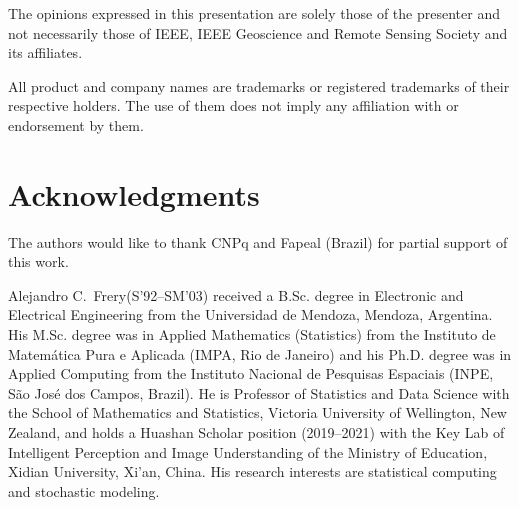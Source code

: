 \documentclass[journal,twoside]{IEEEtran}
\begin{document}
The opinions expressed in this presentation are solely those of the presenter and not necessarily those of IEEE, IEEE Geoscience and Remote Sensing Society and its affiliates.

All product and company names are trademarks or registered trademarks of their respective holders. The use of them does not imply any affiliation with or endorsement by them. 

\section*{Acknowledgments}

The authors would like to thank CNPq and Fapeal (Brazil) for partial support of this work.


	

\begin{IEEEbiography}{Alejandro C.\ Frery}(S'92--SM'03)
received a B.Sc. degree in Electronic and Electrical Engineering from the Universidad de Mendoza, Mendoza, Argentina.
His M.Sc. degree was in Applied Mathematics (Statistics) from the Instituto de Matem\'atica Pura e Aplicada (IMPA, Rio de Janeiro) and his Ph.D. degree was in Applied Computing from the Instituto Nacional de Pesquisas Espaciais (INPE, S\~ao Jos\'e dos Campos, Brazil).
He is Professor of Statistics and Data Science with the School of Mathematics and Statistics, Victoria University of Wellington, New Zealand, and holds a Huashan Scholar position (2019--2021) with the Key Lab of Intelligent Perception and Image Understanding of the Ministry of Education, Xidian University, Xi'an, China.
His research interests are statistical computing and stochastic modeling.
\end{IEEEbiography}
\end{document}
